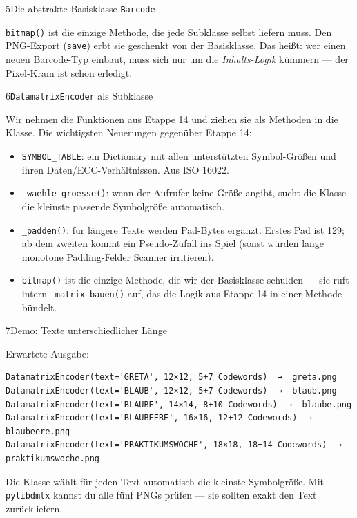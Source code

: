 \begin{pythoneinheit}{5}{Die abstrakte Basisklasse \texttt{Barcode}}

\texttt{bitmap()} ist die einzige Methode, die jede Subklasse selbst
liefern muss. Den PNG-Export (\texttt{save}) erbt sie geschenkt von
der Basisklasse. Das heißt: wer einen neuen Barcode-Typ einbaut,
muss sich nur um die \emph{Inhalts-Logik} kümmern — der Pixel-Kram
ist schon erledigt.
\end{pythoneinheit}

\begin{pythoneinheit}{6}{\texttt{DatamatrixEncoder} als Subklasse}

Wir nehmen die Funktionen aus Etappe 14 und ziehen sie als Methoden
in die Klasse. Die wichtigsten Neuerungen gegenüber Etappe 14:

\begin{itemize}
\item \texttt{SYMBOL\_TABLE}: ein Dictionary mit allen unterstützten
  Symbol-Größen und ihren Daten/ECC-Verhältnissen. Aus ISO 16022.
\item \texttt{\_waehle\_groesse()}: wenn der Aufrufer keine Größe
  angibt, sucht die Klasse die kleinste passende Symbolgröße automatisch.
\item \texttt{\_padden()}: für längere Texte werden Pad-Bytes
  ergänzt. Erstes Pad ist 129; ab dem zweiten kommt ein Pseudo-Zufall
  ins Spiel (sonst würden lange monotone Padding-Felder Scanner
  irritieren).
\item \texttt{bitmap()} ist die einzige Methode, die wir der
  Basisklasse schulden — sie ruft intern \texttt{\_matrix\_bauen()}
  auf, das die Logik aus Etappe 14 in einer Methode bündelt.
\end{itemize}
\end{pythoneinheit}

\begin{pythoneinheit}{7}{Demo: Texte unterschiedlicher Länge}

Erwartete Ausgabe:

\begin{verbatim}
DatamatrixEncoder(text='GRETA', 12×12, 5+7 Codewords)  →  greta.png
DatamatrixEncoder(text='BLAUB', 12×12, 5+7 Codewords)  →  blaub.png
DatamatrixEncoder(text='BLAUBE', 14×14, 8+10 Codewords)  →  blaube.png
DatamatrixEncoder(text='BLAUBEERE', 16×16, 12+12 Codewords)  →  blaubeere.png
DatamatrixEncoder(text='PRAKTIKUMSWOCHE', 18×18, 18+14 Codewords)  →  praktikumswoche.png
\end{verbatim}

Die Klasse wählt für jeden Text automatisch die kleinste Symbolgröße.
Mit \texttt{pylibdmtx} kannst du alle fünf PNGs prüfen — sie sollten
exakt den Text zurückliefern.
\end{pythoneinheit}

